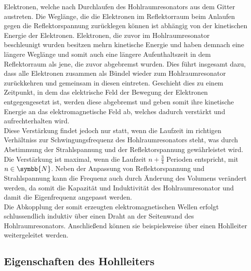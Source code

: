 Elektronen, welche nach Durchlaufen des Hohlraumresonators aus dem Gitter austreten. Die Weglänge, die die
Elektronen im Reflektorraum beim Anlaufen gegen die Reflektorspannung zurücklegen können ist abhängig von der kinetischen
Energie der Elektronen. Elektronen, die zuvor im Hohlraumresonator beschleunigt wurden besitzen mehrn kinetische
Energie und haben demnach eine längere Weglänge und somit auch eine längere Aufenthaltszeit in dem Reflektorraum
als jene, die zuvor abgebremst wurden. Dies führt insgesamt dazu, dass alle Elektronen zusammen als
Bündel wieder zum Hohlraumresonator zurückkehren und gemeinsam in diesen eintreten. Geschieht dies zu einem
Zeitpunkt, in dem das elektrische Feld der Bewegung der Elektronen entgegengesetzt ist, werden diese abgebremst
und geben somit ihre kinetische Energie an das elektromagnetische Feld ab, welches dadurch verstärkt und
aufrechterhalten wird. \\
Diese Verstärkung findet jedoch nur statt, wenn die Laufzeit im richtigen Verhältniss zur Schwingungsfrequenz des
Hohlraumresonators steht, was durch Abstimmung der Strahlspannung und der Reflektorspannung gewährleistet wird.
Die Verstärkung ist maximal, wenn die Laufzeit $n+\frac{3}{4}$ Perioden entspricht, mit $ n \in \symbb{N}$.
Neben der Anpassung von Reflektorspannung und Strahlspannung kann die Frequenz auch durch Änderung des
Volumens verändert werden, da somit die Kapazität und Induktivität des Hohlraumresonator und damit die
Eigenfrequenz angepasst werden. \\
Die Abkopplung der somit erzeugten elektromagnetischen Wellen erfolgt schlussendlich induktiv über einen Draht an der
Seitenwand des Hohlraumresonators. Anschließend können sie beispielsweise über einen Hohlleiter weitergeleitet werden.


\subsection{Eigenschaften des Hohlleiters}

